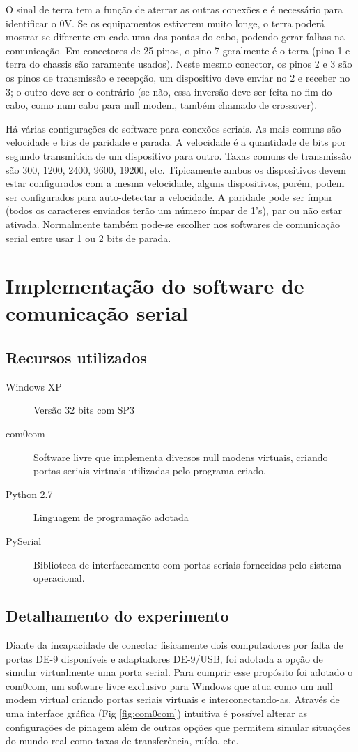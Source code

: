 \documentclass[brazil,times,12pt]{abnt}
\begin{document}
	O sinal de terra tem a função de aterrar as outras conexões e é necessário
	para identificar o 0V. Se os equipamentos estiverem muito longe, o terra 
	poderá mostrar-se diferente em cada uma das pontas do cabo, podendo gerar
	falhas na comunicação. Em conectores de 25 pinos, o pino 7 geralmente é o
	terra (pino 1 e terra do chassis são raramente usados). Neste mesmo conector,
	os pinos 2 e 3 são os pinos de transmissão e recepção, um dispositivo deve
	enviar no 2 e receber no 3; o outro deve ser o contrário (se não, essa
	inversão deve ser feita no fim do cabo, como num cabo para null modem, também
	chamado de crossover).
	
	Há várias configurações de software para conexões seriais. As mais comuns são
	velocidade e bits de paridade e parada. A velocidade é a quantidade de bits
	por segundo transmitida de um dispositivo para outro. Taxas comuns de
	transmissão são 300, 1200, 2400, 9600, 19200, etc. Tipicamente ambos os
	dispositivos devem estar configurados com a mesma velocidade, alguns
	dispositivos, porém, podem ser configurados para auto-detectar a velocidade. A
	paridade pode ser ímpar (todos os caracteres enviados terão um número ímpar de
	1's), par ou não estar ativada. Normalmente também pode-se escolher nos
	softwares de comunicação serial entre usar 1 ou 2 bits de parada. \cite{wiki:rs232}
	
\section*{Implementação do software de comunicação serial}
	\subsection*{Recursos utilizados}
	\begin{description}
	  \item[Windows XP] Versão 32 bits com SP3
	  \item[com0com] Software livre que implementa diversos null modens virtuais,
	  criando portas seriais virtuais utilizadas pelo programa criado.
	  \item[Python 2.7] Linguagem de programação adotada
	  \item[PySerial] Biblioteca de interfaceamento com portas seriais fornecidas
	  pelo sistema operacional.
	\end{description}

	\subsection*{Detalhamento do experimento}
	Diante da incapacidade de conectar fisicamente dois computadores por falta de
	portas DE-9 disponíveis e adaptadores DE-9/USB, foi adotada a opção de simular
	virtualmente uma porta serial. Para cumprir esse propósito foi adotado o
	com0com, um software livre exclusivo para Windows que atua como um null modem
	virtual criando portas seriais virtuais e interconectando-as. Através de uma
	interface gráfica (Fig \ref{fig:com0com}) intuitiva é possível alterar as configurações
	de pinagem além de outras opções que permitem simular situações do mundo real como taxas de
	transferência, ruído, etc.
	
\end{document}
